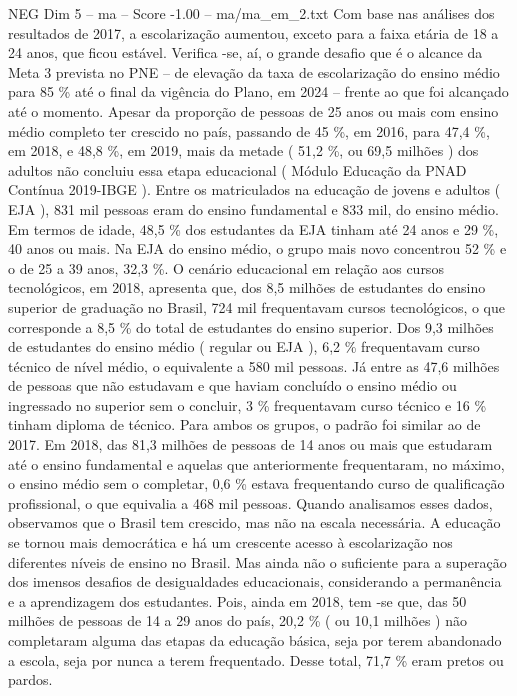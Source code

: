\begin{textsample}{NEG Dim 5 – ma – Score -1.00 – ma/ma\_em\_2.txt}
Com base nas análises dos resultados de 2017, a escolarização aumentou, exceto para a faixa etária de 18 a 24 anos, que ficou estável.
Verifica -se, aí, o grande desafio que é o alcance da Meta 3 prevista no PNE – de elevação da taxa de escolarização do ensino médio para 85 \% até o final da vigência do Plano, em 2024 – frente ao que foi alcançado até o momento.
Apesar da proporção de pessoas de 25 anos ou mais com ensino médio completo ter crescido no país, passando de 45 \%, em 2016, para 47,4 \%, em 2018, e 48,8 \%, em 2019, mais da metade ( 51,2 \%, ou 69,5 milhões ) dos adultos não concluiu essa etapa educacional ( Módulo Educação da PNAD Contínua 2019-IBGE ).
Entre os matriculados na educação de jovens e adultos ( EJA ), 831 mil pessoas eram do ensino fundamental e 833 mil, do ensino médio.
Em termos de idade, 48,5 \% dos estudantes da EJA tinham até 24 anos e 29 \%, 40 anos ou mais.
Na EJA do ensino médio, o grupo mais novo concentrou 52 \% e o de 25 a 39 anos, 32,3 \%.
O cenário educacional em relação aos cursos tecnológicos, em 2018, apresenta que, dos 8,5 milhões de estudantes do ensino superior de graduação no Brasil, 724 mil frequentavam cursos tecnológicos, o que corresponde a 8,5 \% do total de estudantes do ensino superior.
Dos 9,3 milhões de estudantes do ensino médio ( regular ou EJA ), 6,2 \% frequentavam curso técnico de nível médio, o equivalente a 580 mil pessoas.
Já entre as 47,6 milhões de pessoas que não estudavam e que haviam concluído o ensino médio ou ingressado no superior sem o concluir, 3 \% frequentavam curso técnico e 16 \% tinham diploma de técnico.
Para ambos os grupos, o padrão foi similar ao de 2017.
Em 2018, das 81,3 milhões de pessoas de 14 anos ou mais que estudaram até o ensino fundamental e aquelas que anteriormente frequentaram, no máximo, o ensino médio sem o completar, 0,6 \% estava frequentando curso de qualificação profissional, o que equivalia a 468 mil pessoas.
Quando analisamos esses dados, observamos que o Brasil tem crescido, mas não na escala necessária.
A educação se tornou mais democrática e há um crescente acesso à escolarização nos diferentes níveis de ensino no Brasil.
Mas ainda não o suficiente para a superação dos imensos desafios de desigualdades educacionais, considerando a permanência e a aprendizagem dos estudantes.
Pois, ainda em 2018, tem -se que, das 50 milhões de pessoas de 14 a 29 anos do país, 20,2 \% ( ou 10,1 milhões ) não completaram alguma das etapas da educação básica, seja por terem abandonado a escola, seja por nunca a terem frequentado.
Desse total, 71,7 \% eram pretos ou pardos.

\end{textsample}
